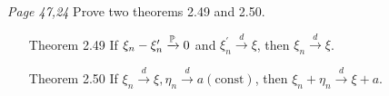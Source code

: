 \begin{enumerate}
\prob\textit{Page 47,24}
Prove two theorems 2.49 and 2.50.
\begin{enumerate}
	\item[Theorem 2.49] If $\xi_n-\xi^\prime_n\xrightarrow{\mathbb{P}} 0$ and $\xi^\prime_n\xrightarrow{d} \xi$, then $\xi_n\xrightarrow{d} \xi$.
	\item[Theorem 2.50] If $\xi_n\xrightarrow{d} \xi,\eta_n\xrightarrow{d}a(\mathrm{const})$, then $\xi_n+\eta_n\xrightarrow{d}\xi+a$. 
\end{enumerate}
\soln \vspace{5em}

\end{enumerate}